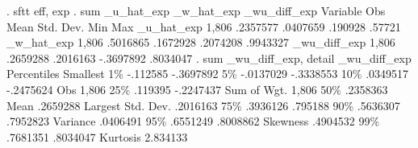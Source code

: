 . sftt eff, exp
{\smallskip}
. sum _u_hat_exp _w_hat_exp _wu_diff_exp
{\smallskip}
    Variable {\VBAR}        Obs        Mean    Std. Dev.       Min        Max
  _u_hat_exp {\VBAR}      1,806    .2357577    .0407659    .190928     .57721
  _w_hat_exp {\VBAR}      1,806    .5016865    .1672928   .2074208   .9943327
_wu_diff_exp {\VBAR}      1,806    .2659288    .2016163  -.3697892   .8034047
{\smallskip}
. sum _wu_diff_exp, detail
{\smallskip}
                        _wu_diff_exp
      Percentiles      Smallest
 1\%     -.112585      -.3697892
 5\%    -.0137029      -.3338553
10\%     .0349517      -.2475624       Obs               1,806
25\%      .119395      -.2247437       Sum of Wgt.       1,806
{\smallskip}
50\%     .2358363                      Mean           .2659288
                        Largest       Std. Dev.      .2016163
75\%     .3936126        .795188
90\%     .5636307       .7952823       Variance       .0406491
95\%     .6551249       .8008862       Skewness       .4904532
99\%     .7681351       .8034047       Kurtosis       2.834133
{\smallskip}
